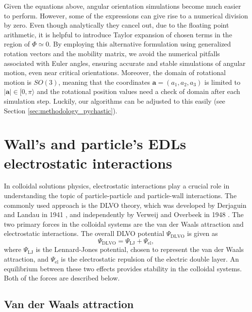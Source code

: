 \documentclass{master_thesis}
\begin{document}
Given the equations above, angular orientation simulations become much easier to perform. However, some of the expressions can give rise to a numerical division by zero. Even though analytically they cancel out, due to the floating point arithmetic, it is helpful to introduce Taylor expansion of chosen terms in the region of $\Phi \simeq 0$. By employing this alternative formulation using generalized rotation vectors and the mobility matrix, we avoid the numerical pitfalls associated with Euler angles, ensuring accurate and stable simulations of angular motion, even near critical orientations. Moreover, the domain of rotational motion is $SO(3)$, meaning that the coordinates $\boldsymbol{a} = (a_1, a_2, a_3)$ is limited to $|\boldsymbol{a}|\in[0,\pi\rangle$ and the rotational position values need a check of domain after each simulation step. Luckily, our algorithms can be adjusted to this easily (see Section \ref{sec:methodology_pychastic}).

\section{Wall's and particle's EDLs electrostatic interactions} \label{sec:electr_theory}

In colloidal solutions physics, electrostatic interactions play a crucial role in understanding the topic of particle-particle and particle-wall interactions. The commonly used approach is the DLVO theory, which was developed by Derjaguin and Landau in 1941 \cite{derjaguin_landau_1941}, and independently by Verweij and Overbeek in 1948 \cite{verwey_overbeek_1948}. The two primary forces in the colloidal systems are the van der Waals attraction and electrostatic interactions. The overall DLVO potential $\Psi_{\textrm{DLVO}}$ is given as
\begin{equation}
    \Psi_{\textrm{DLVO}} = \Psi_{\textrm{LJ}} + \Psi_{\textrm{el}},
\end{equation}
where $\Psi_{\textrm{LJ}}$ is the Lennard-Jones potential, chosen to represent the van der Waals attraction, and $\Psi_{\textrm{el}}$ is the electrostatic repulsion of the electric double layer. An equilibrium between these two effects provides stability in the colloidal systems. Both of the forces are described below.

\subsection{Van der Waals attraction}
\end{document}
